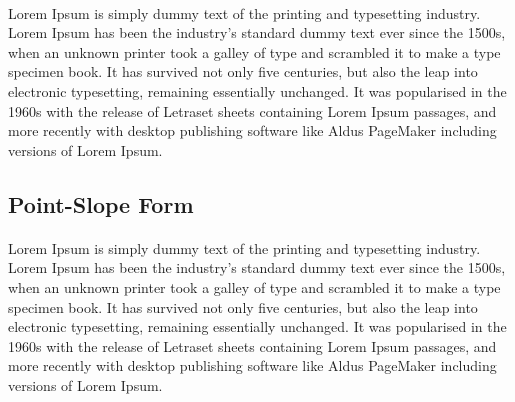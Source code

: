 \documentclass[a4paper, 12pt]{report}
\begin{document}
  	    	\paragraph{}
  	  		Lorem Ipsum is simply dummy text of the printing and typesetting industry. Lorem Ipsum has been the industry's standard dummy text ever since the 1500s, when an unknown printer took a galley of type and scrambled it to make a type specimen book. It has survived not only five centuries, but also the leap into electronic typesetting, remaining essentially unchanged. It was popularised in the 1960s with the release of Letraset sheets containing Lorem Ipsum passages, and more recently with desktop publishing software like Aldus PageMaker including versions of Lorem Ipsum.
  	  		\subsection{Point-Slope Form}
  	  	 	\paragraph{}
  	  		Lorem Ipsum is simply dummy text of the printing and typesetting industry. Lorem Ipsum has been the industry's standard dummy text ever since the 1500s, when an unknown printer took a galley of type and scrambled it to make a type specimen book. It has survived not only five centuries, but also the leap into electronic typesetting, remaining essentially unchanged. It was popularised in the 1960s with the release of Letraset sheets containing Lorem Ipsum passages, and more recently with desktop publishing software like Aldus PageMaker including versions of Lorem Ipsum.
\end{document}
